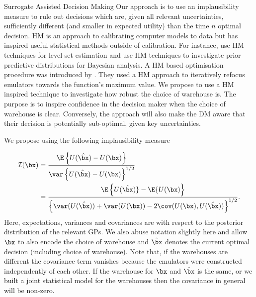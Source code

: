 \begin{chapter}{Surrogate Assisted Decision Making \label{Chap:optimisation}}
Our approach is to use an implausibility measure to rule out decisions which are, given all relevant uncertainties, sufficiently different (and smaller in expected utility) than the time $n$ optimal decision. HM is an approach to calibrating computer models to data \citep{Vernon14, andrianakis2017a} but has inspired useful statistical methods outside of calibration. For instance, \citet{Baker2020c} use HM techniques for level set estimation and \citet{Wang2018} use HM techniques to investigate prior predictive distributions for Bayesian analysis. A HM based optimisation procedure was introduced by \citet{Lawson2016}. They used a HM approach to iteratively refocus emulators towards the function's maximum value. We propose to use a HM inspired technique to investigate how robust the choice of warehouse is. The purpose is to inspire confidence in the decision maker when the choice of warehouse is clear. Conversely, the approach will also make the DM aware that their decision is potentially sub-optimal, given key uncertainties.

We propose using the following implausibility measure

\begin{align}
  \mathcal{I}(\bx) &= \frac{ \E \left\{ U(\hat{\bx}) - U(\bx)\right\}}{\var \left\{ U(\hat{\bx}) - U(\bx)\right\}^{1/2} }\\
  &=\frac{\E \left\{ U(\hat{\bx}) \}  - \E \{U(\bx)\right\}}{ \left\{ \var(U(\hat{\bx})) + \var(U(\bx)) - 2\cov(U(\bx), U(\hat{\bx})) \right\}^{1/2} }.
\end{align}
Here, expectations, variances and covariances are with respect to the posterior distribution of the relevant GPs. We also abuse notation slightly here and allow $\bx$ to also encode the choice of warehouse and $\hat{\bx}$ denotes the current optimal decision (including choice of warehouse). Note that, if the warehouses are different the covariance term vanishes because the emulators were constructed independently of each other. If the warehouse for $\bx$ and $\hat{\bx}$ is the same, or we built a joint statistical model for the warehouses then the covariance in general will be non-zero.


\end{chapter}
